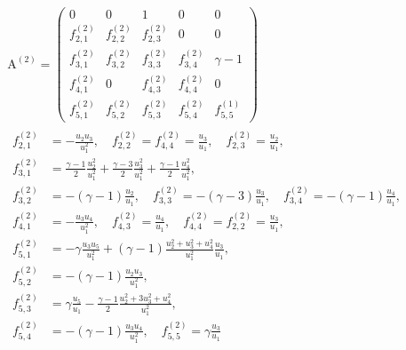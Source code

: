 \documentclass{turgon}
\begin{document}
\begin{gather}
  \begin{gathered}
    \mathrm{A}^{(2)} = \left(
    \begin{array}{ccccc}
      0             & 0             & 1             & 0             & 0 \\
      f^{(2)}_{2,1} & f^{(2)}_{2,2} & f^{(2)}_{2,3} & 0             & 0 \\
      f^{(2)}_{3,1} & f^{(2)}_{3,2} & f^{(2)}_{3,3} & f^{(2)}_{3,4} &
      \gamma - 1 \\
      f^{(2)}_{4,1} & 0             & f^{(2)}_{4,3} & f^{(2)}_{4,4} & 0 \\
      f^{(2)}_{5,1} & f^{(2)}_{5,2} & f^{(2)}_{5,3} & f^{(2)}_{5,4} &
      f^{(1)}_{5,5}
    \end{array}
    \right)
    \\
    \begin{aligned}
      f^{(2)}_{2,1} &= -\frac{u_2 u_3}{u_1^2}, \quad
      f^{(2)}_{2,2} = f^{(2)}_{4,4} = \frac{u_3}{u_1}, \quad
      f^{(2)}_{2,3} = \frac{u_2}{u_1}, \\
      f^{(2)}_{3,1} &= \frac{\gamma-1}{2}\frac{u_2^2}{u_1^2}
      + \frac{\gamma-3}{2}\frac{u_3^2}{u_1^2}
      + \frac{\gamma-1}{2}\frac{u_4^2}{u_1^2}, \\
      f^{(2)}_{3,2} &= -(\gamma-1)\frac{u_2}{u_1}, \quad
      f^{(2)}_{3,3} = -(\gamma-3)\frac{u_3}{u_1}, \quad
      f^{(2)}_{3,4} = -(\gamma-1)\frac{u_4}{u_1}, \\
      f^{(2)}_{4,1} &= -\frac{u_3 u_4}{u_1^2}, \quad
      f^{(2)}_{4,3} = \frac{u_4}{u_1}, \quad
      f^{(2)}_{4,4} = f^{(2)}_{2,2} = \frac{u_3}{u_1}, \\
      f^{(2)}_{5,1} &= -\gamma\frac{u_3 u_5}{u_1^2}
      + (\gamma-1)\frac{u_2^2+u_3^2+u_4^2}{u_1^2}\frac{u_3}{u_1}, \\
      f^{(2)}_{5,2} &= -(\gamma-1)\frac{u_2 u_3}{u_1^2}, \\
      f^{(2)}_{5,3} &= \gamma\frac{u_5}{u_1}
      - \frac{\gamma-1}{2}\frac{u_2^2 + 3u_3^2 + u_4^2}{u_1^2}, \\
      f^{(2)}_{5,4} &= -(\gamma-1)\frac{u_3 u_4}{u_1^2}, \quad
      f^{(2)}_{5,5} = \gamma\frac{u_3}{u_1}
    \end{aligned}
  \end{gathered}
  \label{e:euler:jaco2}
\end{gather}
%
\end{document}
